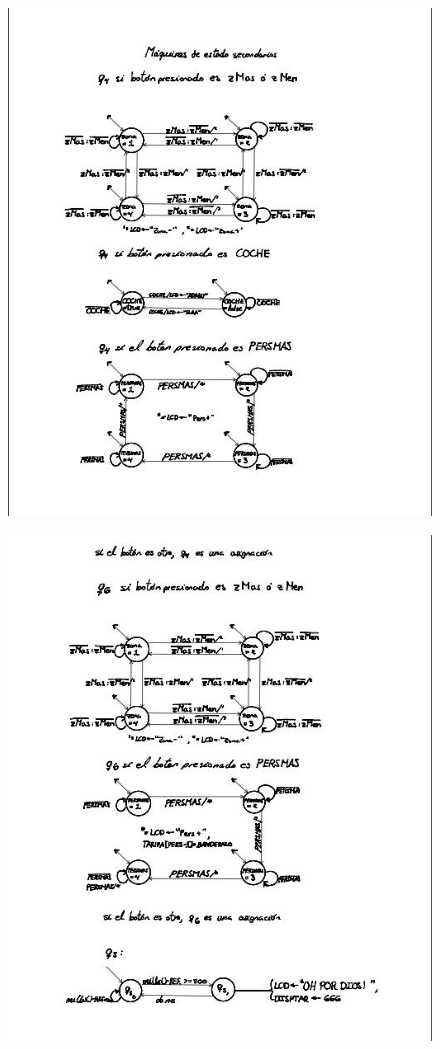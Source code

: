 \documentclass[a4paper,11pt]{article}
\begin{document}
\begin{figure}[h]
	\centering
	\includegraphics{images/maq2.jpg}
\end{figure}
\newpage
\begin{figure}[h]
	\centering
	\includegraphics{images/maq3.jpg}
\end{figure}
\end{document}
